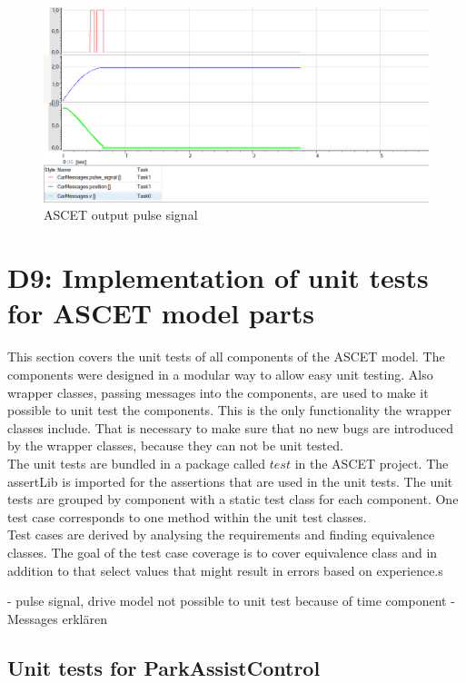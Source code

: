 \begin{figure}[H]
\centering
\includegraphics[width=1 \textwidth]{images/ASCET_pulseSignal.png}
\caption{ASCET output pulse signal}
\label{fig:BlockdiagrammPulseSignalOutput}
\end{figure}

\chapter{D9: Implementation of unit tests for ASCET model parts}\label{cha:D9}
This section covers the unit tests of all components of the ASCET model.
The components were designed in a modular way to allow easy unit testing.
Also wrapper classes, passing messages into the components, are used to make it possible to unit test the components.
This is the only functionality the wrapper classes include.
That is necessary to make sure that no new bugs are introduced by the wrapper classes, because they can not be unit tested.\\
The unit tests are bundled in a package called $test$ in the ASCET project. The assertLib is imported for the assertions that are used in the unit tests. The unit tests are grouped by component with a static test class for each component. One test case corresponds to one method within the unit test classes.\\

Test cases are derived by analysing the requirements and finding equivalence classes.
The goal of the test case coverage is to cover equivalence class and in addition to that select values that might result in errors based on experience.s

- pulse signal, drive model not possible to unit test because of time component
- Messages erklären\\

\section{Unit tests for ParkAssistControl}

